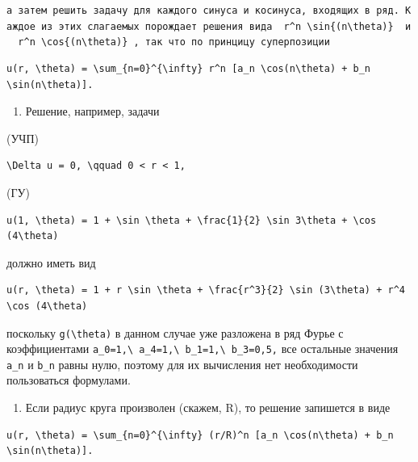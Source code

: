 \documentclass[
  ukrainian,
]{article}
\providecommand{\tightlist}{%
  \setlength{\itemsep}{0pt}\setlength{\parskip}{0pt}}
\begin{document}
\texttt{а\ затем\ решить\ задачу\ для\ каждого\ синуса\ и\ косинуса,\ входящих\ в\ ряд.\ Каждое\ из\ этих\ слагаемых\ порождает\ решения\ вида\ \ \textquotesingle{}r\^{}n\ \textbackslash{}sin\{(n\textbackslash{}theta)\}\textquotesingle{}\ \ и\ \ \textquotesingle{}r\^{}n\ \textbackslash{}cos\{(n\textbackslash{}theta)\}\textquotesingle{}\ ,\ так\ что\ по\ принцицу\ суперпозиции}

\begin{verbatim}
u(r, \theta) = \sum_{n=0}^{\infty} r^n [a_n \cos(n\theta) + b_n \sin(n\theta)].
\end{verbatim}

\begin{enumerate}
\def\labelenumi{\arabic{enumi}.}
\setcounter{enumi}{1}
\tightlist
\item
  Решение, например, задачи
\end{enumerate}

(УЧП)

\begin{verbatim}
\Delta u = 0, \qquad 0 < r < 1,
\end{verbatim}

(ГУ)

\begin{verbatim}
u(1, \theta) = 1 + \sin \theta + \frac{1}{2} \sin 3\theta + \cos (4\theta)
\end{verbatim}

должно иметь вид

\begin{verbatim}
u(r, \theta) = 1 + r \sin \theta + \frac{r^3}{2} \sin (3\theta) + r^4 \cos (4\theta)
\end{verbatim}

поскольку \texttt{g(\textbackslash{}theta)} в данном случае уже
разложена в ряд Фурье с коэффициентами
\texttt{a\_0=1,\textbackslash{}\ a\_4=1,\textbackslash{}\ b\_1=1,\textbackslash{}\ b\_3=0,5,}
все остальные значения \texttt{a\_n} и \texttt{b\_n} равны нулю, поэтому
для их вычисления нет необходимости пользоваться формулами.

\begin{enumerate}
\def\labelenumi{\arabic{enumi}.}
\setcounter{enumi}{2}
\tightlist
\item
  Если радиус круга произволен (скажем, R), то решение запишется в виде
\end{enumerate}

\begin{verbatim}
u(r, \theta) = \sum_{n=0}^{\infty} (r/R)^n [a_n \cos(n\theta) + b_n \sin(n\theta)].
\end{verbatim}
\end{document}
